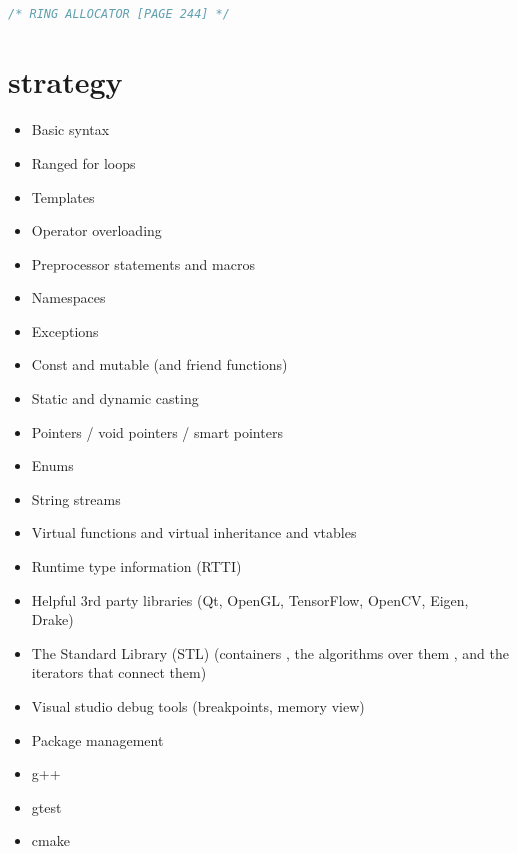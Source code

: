 \documentclass[8pt]{extarticle}
\begin{document}
\begin{small}
\begin{multicols}{2}
\begin{lstlisting}[language=C]
	
\end{lstlisting}


\begin{lstlisting}[language=C]
/* RING ALLOCATOR [PAGE 244] */
\end{lstlisting}



\section*{strategy}

\begin{itemize}
\item Basic syntax
\item Ranged for loops
\item Templates
\item Operator overloading
\item Preprocessor statements and macros
\item Namespaces
\item Exceptions
\item Const and mutable (and friend functions)
\item Static and dynamic casting
\item Pointers / void pointers / smart pointers
\item Enums
\item String streams
\item Virtual functions and virtual inheritance and vtables
\item Runtime type information (RTTI)
\item Helpful 3rd party libraries (Qt, OpenGL, TensorFlow, OpenCV, Eigen, Drake)
\item The Standard Library (STL) (containers , the algorithms over them , and the iterators that connect them)
\item Visual studio debug tools (breakpoints, memory view)
\item Package management
\item g++
\item gtest
\item cmake
\end{itemize}

\vfill\null
\vfill\null
\columnbreak


\end{multicols}
\end{small}
\end{document}
